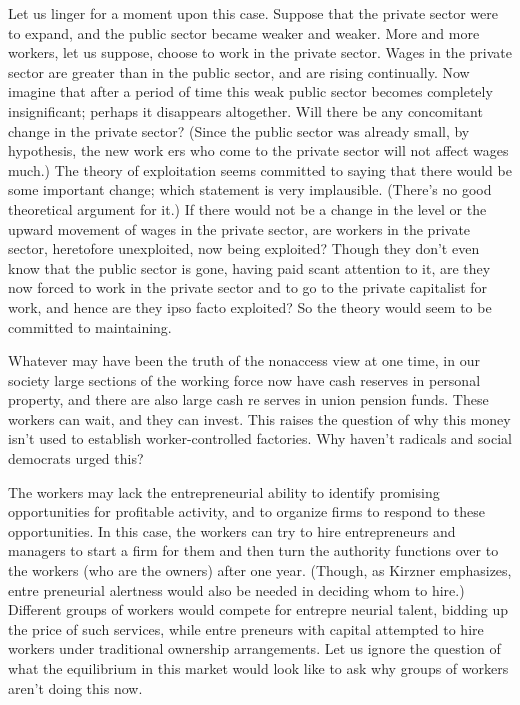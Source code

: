 \documentclass[11pt,openany]{book}
\begin{document}
Let us linger for a moment upon this case. Suppose that the private sector were to expand, and the public sector became weaker and weaker. More and more workers, let us suppose, choose to work in the private sector. Wages in the private sector are greater than in the public sector, and are rising continually. Now imagine that after a period of time this weak public sector becomes completely insignificant; perhaps it disappears altogether. Will there be any concomitant change in the private sector? (Since the public sector was already small, by hypothesis, the new work ers who come to the private sector will not affect wages much.) The theory of exploitation seems committed to saying that there would be some important change; which statement is very implausible. (There's no good theoretical argument for it.) If there would not be a change in the level or the upward movement of wages in the private sector, are workers in the private sector, heretofore unexploited, now being exploited? Though they don't even know that the public sector is gone, having paid scant attention to it, are they now forced to work in the private sector and to go to the private capitalist for work, and hence are they ipso facto exploited? So the theory would seem to be committed to maintaining. 

Whatever may have been the truth of the nonaccess view at one time, in our society large sections of the working force now have cash reserves in personal property, and there are also large cash re serves in union pension funds. These workers can wait, and they can invest. This raises the question of why this money isn't used to establish worker-controlled factories. Why haven't radicals and social democrats urged this? 

The workers may lack the entrepreneurial ability to identify promising opportunities for profitable activity, and to organize firms to respond to these opportunities. In this case, the workers can try to hire entrepreneurs and managers to start a firm for them and then turn the authority functions over to the workers (who are the owners) after one year. (Though, as Kirzner emphasizes, entre preneurial alertness would also be needed in deciding whom to hire.) Different groups of workers would compete for entrepre neurial talent, bidding up the price of such services, while entre preneurs with capital attempted to hire workers under traditional ownership arrangements. Let us ignore the question of what the equilibrium in this market would look like to ask why groups of workers aren't doing this now. 
\end{document}

